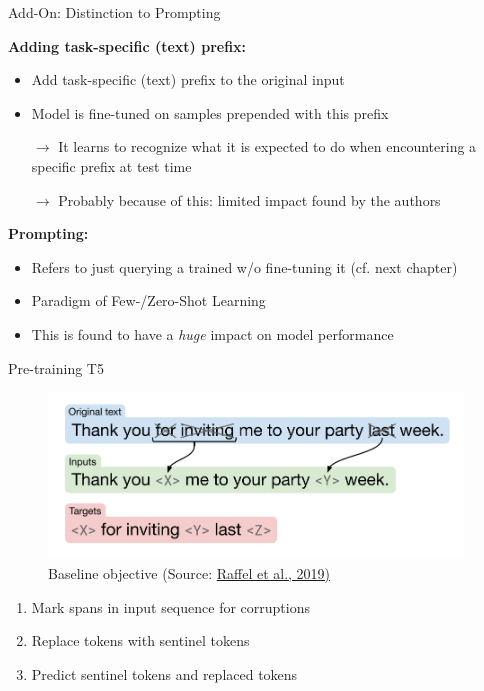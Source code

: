 \begin{frame}{Add-On: Distinction to Prompting}

\vfill

	\textbf{Adding task-specific (text) prefix:}

	\begin{itemize}
		\item Add task-specific (text) prefix to the original input
		\item Model is fine-tuned on samples prepended with this prefix
		\item[$\to$] It learns to recognize what it is expected to do when encountering a specific prefix at test time
		\item[$\to$] Probably because of this: limited impact found by the authors
	\end{itemize}
	
	\vspace{.5cm}

	\textbf{Prompting:}

	\begin{itemize}
		\item Refers to just querying a trained w/o fine-tuning it (cf. next chapter)
		\item Paradigm of Few-/Zero-Shot Learning
		\item This is found to have a \textit{huge} impact on model performance
	\end{itemize}
	
\vfill

\end{frame}


\begin{frame}{Pre-training T5}

\vfill
	
	\begin{figure}
		\centering
		\includegraphics[width = 11cm]{figure/t5-span-pred.png}\\ 
		\footnotesize{Baseline objective (Source:} \href{https://arxiv.org/pdf/1910.10683.pdf}{\footnotesize Raffel et al., 2019)}
	\end{figure}
	
	\begin{enumerate}
		\item Mark spans in input sequence for corruptions
		\item Replace tokens with sentinel tokens
		\item Predict sentinel tokens and replaced tokens
	\end{enumerate}
	
\vfill

\end{frame}


